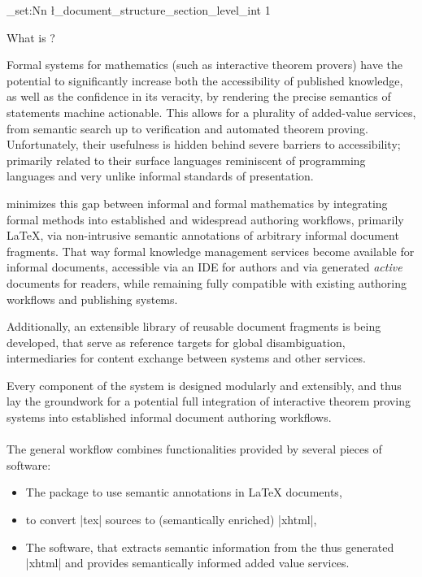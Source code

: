 \ExplSyntaxOn
\int_set:Nn \l_document_structure_section_level_int {1}
\ExplSyntaxOff

\clearpage

{%
  \def\\{:}%
  \tableofcontents
}

\clearpage
{}
	
\fi

\long{}

\begin{omgroup}{What is \sTeX?}
  
Formal systems for mathematics (such as interactive theorem provers)
have the potential to significantly increase both the accessibility
of published knowledge, as well as the confidence in its veracity,
by rendering the precise semantics of statements machine actionable.
This allows for a plurality of added-value services, from semantic
search up to verification and automated theorem proving.
Unfortunately, their usefulness is hidden behind severe barriers
to accessibility; primarily related to their surface languages
reminiscent of programming languages and very unlike informal
standards of presentation.

\sTeX minimizes this gap between informal and formal 
mathematics by integrating formal methods into established
and widespread authoring workflows, primarily \LaTeX, via 
non-intrusive semantic
annotations of arbitrary informal document fragments. That way
formal knowledge management services become available for informal
documents, accessible via an IDE for authors and via generated
\emph{active} documents for readers, while remaining fully compatible
with existing authoring workflows and publishing systems.

Additionally, an extensible library of reusable
document fragments is being developed, that serve as reference targets
for global disambiguation, intermediaries for content exchange
between systems and other services.

Every component of the system is designed modularly and extensibly,
and thus lay the groundwork for a potential full integration of
interactive theorem proving systems into established informal document
authoring workflows.

\paragraph{} The general \sTeX workflow combines functionalities
provided by several pieces of software:
\begin{itemize}
  \item The \sTeX package to use semantic annotations in
    {\LaTeX} documents,
  \item \RusTeX to convert |tex| sources to (semantically enriched)
    |xhtml|,
  \item The \mmt software, that extracts semantic information
    from the thus generated |xhtml| and provides semantically informed
    added value services.
\end{itemize}



\end{omgroup}
